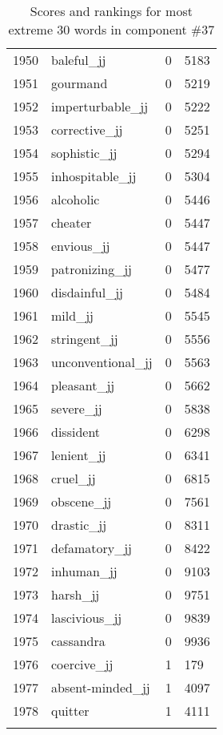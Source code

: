\begin{longtable}[!htbp]{| rlr@{.}l |}
    1950 & baleful\_jj & 0 & 5183 \\
    1951 & gourmand & 0 & 5219 \\
    1952 & imperturbable\_jj & 0 & 5222 \\
    1953 & corrective\_jj & 0 & 5251 \\
    1954 & sophistic\_jj & 0 & 5294 \\
    1955 & inhospitable\_jj & 0 & 5304 \\
    1956 & alcoholic & 0 & 5446 \\
    1957 & cheater & 0 & 5447 \\
    1958 & envious\_jj & 0 & 5447 \\
    1959 & patronizing\_jj & 0 & 5477 \\
    1960 & disdainful\_jj & 0 & 5484 \\
    1961 & mild\_jj & 0 & 5545 \\
    1962 & stringent\_jj & 0 & 5556 \\
    1963 & unconventional\_jj & 0 & 5563 \\
    1964 & pleasant\_jj & 0 & 5662 \\
    1965 & severe\_jj & 0 & 5838 \\
    1966 & dissident & 0 & 6298 \\
    1967 & lenient\_jj & 0 & 6341 \\
    1968 & cruel\_jj & 0 & 6815 \\
    1969 & obscene\_jj & 0 & 7561 \\
    1970 & drastic\_jj & 0 & 8311 \\
    1971 & defamatory\_jj & 0 & 8422 \\
    1972 & inhuman\_jj & 0 & 9103 \\
    1973 & harsh\_jj & 0 & 9751 \\
    1974 & lascivious\_jj & 0 & 9839 \\
    1975 & cassandra & 0 & 9936 \\
    1976 & coercive\_jj & 1 & 179 \\
    1977 & absent-minded\_jj & 1 & 4097 \\
    1978 & quitter & 1 & 4111 \\
    \hline
    \caption{Scores and rankings for most extreme 30 words in component \#37} \\
\end{longtable}

